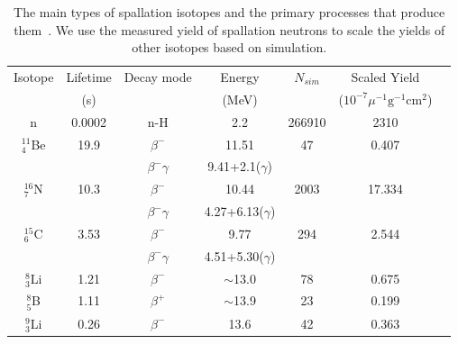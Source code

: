 \begin{table}[htbp]
	\centering
	\caption{The main types of spallation isotopes and the primary processes that produce them~\cite{spallation_isotops}. We use the measured yield of spallation neutrons to scale the yields of other isotopes based on simulation.}%
	\label{tab:solar_spallation_bkg}
	\begin{tabular}{ccccccc}
		\toprule
		Isotope       & Lifetime & Decay mode        & Energy               & $N_{sim}$ & Scaled Yield                                      \\
		              & (\si{s}) &                   & (\si{MeV})           &           & ($10^{-7}\mu^{-1}\mathrm{g}^{-1}\mathrm{cm}^{2}$) \\
		\midrule
		n             & 0.0002   & n-H               & 2.2                  & 266910    & 2310                                              \\
		\addlinespace
		$^{11}_{4}$Be & 19.9     & $\beta^{-}$       & 11.51                & 47        & 0.407                                             \\
		              &          & $\beta^{-}\gamma$ & 9.41+2.1($\gamma$)   &           &                                                   \\
		\addlinespace
		$^{16}_{7}$N  & 10.3     & $\beta^{-}$       & 10.44                & 2003      & 17.334                                            \\
		              &          & $\beta^{-}\gamma$ & 4.27+6.13($\gamma$)                                                                  \\
		\addlinespace
		$^{15}_{6}$C  & 3.53     & $\beta^{-}$       & 9.77                 & 294       & 2.544                                             \\
		              &          & $\beta^{-}\gamma$ & 4.51+5.30($\gamma$)                                                                  \\
		\addlinespace
		$^{8}_{3}$Li  & 1.21     & $\beta^{-}$       & $\sim$13.0           & 78        & 0.675                                             \\
		\addlinespace
		$^{8}_{5}$B   & 1.11     & $\beta^{+}$       & $\sim$13.9           & 23        & 0.199                                             \\
		\addlinespace
		$^{9}_{3}$Li  & 0.26     & $\beta^{-}$       & 13.6                 & 42        & 0.363                                             \\

\end{tabular}
\end{table}
